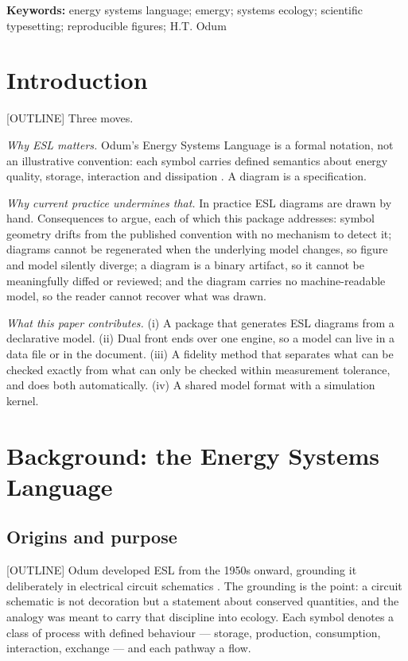 \noindent\textbf{Keywords:} energy systems language; emergy; systems ecology;
scientific typesetting; reproducible figures; H.T. Odum

\section{Introduction}
\label{sec:intro}

[OUTLINE] Three moves.

\emph{Why ESL matters.} Odum's Energy Systems Language is a formal notation, not
an illustrative convention: each symbol carries defined semantics about energy
quality, storage, interaction and dissipation \citep{odum1994,odum1996}. A
diagram is a specification.

\emph{Why current practice undermines that.} In practice ESL diagrams are drawn
by hand. Consequences to argue, each of which this package addresses: symbol
geometry drifts from the published convention with no mechanism to detect it;
diagrams cannot be regenerated when the underlying model changes, so figure and
model silently diverge; a diagram is a binary artifact, so it cannot be
meaningfully diffed or reviewed; and the diagram carries no machine-readable
model, so the reader cannot recover what was drawn.

\emph{What this paper contributes.} (i) A package that generates ESL diagrams
from a declarative model. (ii) Dual front ends over one engine, so a model can
live in a data file or in the document. (iii) A fidelity method that separates
what can be checked exactly from what can only be checked within measurement
tolerance, and does both automatically. (iv) A shared model format with a
simulation kernel.

\section{Background: the Energy Systems Language}
\label{sec:background}

\subsection{Origins and purpose}

[OUTLINE] Odum developed ESL from the 1950s onward, grounding it deliberately in
electrical circuit schematics \citep{odum1971,odum1994}. The grounding is the
point: a circuit schematic is not decoration but a statement about conserved
quantities, and the analogy was meant to carry that discipline into ecology.
Each symbol denotes a class of process with defined behaviour --- storage,
production, consumption, interaction, exchange --- and each pathway a flow.

